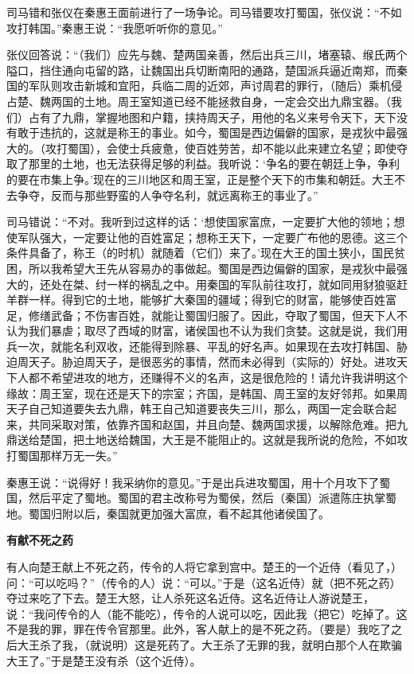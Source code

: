 \documentclass[12pt,UTF-8,openany,a4]{ctexbook}
\begin{document}
\begin{large}
    司马错和张仪在秦惠王面前进行了一场争论。司马错要攻打蜀国，张仪说：“不如攻打韩国。”秦惠王说：“我愿听听你的意见。”
    
    张仪回答说：“（我们）应先与魏、楚两国亲善，然后出兵三川，堵塞辕、缑氏两个隘口，挡住通向屯留的路，让魏国出兵切断南阳的通路，楚国派兵逼近南郑，而秦国的军队则攻击新城和宜阳，兵临二周的近郊，声讨周君的罪行，（随后）乘机侵占楚、魏两国的土地。周王室知道已经不能拯救自身，一定会交出九鼎宝器。（我们）占有了九鼎，掌握地图和户籍，挟持周天子，用他的名义来号令天下，天下没有敢于违抗的，这就是称王的事业。如今，蜀国是西边偏僻的国家，是戎狄中最强大的。（攻打蜀国），会使士兵疲惫，使百姓劳苦，却不能以此来建立名望；即使夺取了那里的土地，也无法获得足够的利益。我听说：‘争名的要在朝廷上争，争利的要在市集上争。’现在的三川地区和周王室，正是整个天下的市集和朝廷。大王不去争夺，反而与那些野蛮的人争夺名利，就远离称王的事业了。”
    
    司马错说：“不对。我听到过这样的话：‘想使国家富庶，一定要扩大他的领地；想使军队强大，一定要让他的百姓富足；想称王天下，一定要广布他的恩德。这三个条件具备了，称王（的时机）就随着（它们）来了。’现在大王的国土狭小，国民贫困，所以我希望大王先从容易办的事做起。蜀国是西边偏僻的国家，是戎狄中最强大的，还处在桀、纣一样的祸乱之中。用秦国的军队前往攻打，就如同用豺狼驱赶羊群一样。得到它的土地，能够扩大秦国的疆域；得到它的财富，能够使百姓富足，修缮武备；不伤害百姓，就能让蜀国归服了。因此，夺取了蜀国，但天下人不认为我们暴虐；取尽了西域的财富，诸侯国也不认为我们贪婪。这就是说，我们用兵一次，就能名利双收，还能得到除暴、平乱的好名声。如果现在去攻打韩国、胁迫周天子。胁迫周天子，是很恶劣的事情，然而未必得到（实际的）好处。进攻天下人都不希望进攻的地方，还赚得不义的名声，这是很危险的！请允许我讲明这个缘故：周王室，现在还是天下的宗室；齐国，是韩国、周王室的友好邻邦。如果周天子自己知道要失去九鼎，韩王自己知道要丧失三川，那么，两国一定会联合起来，共同采取对策，依靠齐国和赵国，并且向楚、魏两国求援，以解除危难。把九鼎送给楚国，把土地送给魏国，大王是不能阻止的。这就是我所说的危险，不如攻打蜀国那样万无一失。”
    
    秦惠王说：“说得好！我采纳你的意见。”于是出兵进攻蜀国，用十个月攻下了蜀国，然后平定了蜀地。蜀国的君主改称号为蜀侯，然后（秦国）派遣陈庄执掌蜀地。蜀国归附以后，秦国就更加强大富庶，看不起其他诸侯国了。
    
    \begin{center}{\Large\textbf{有献不死之药}}\end{center}
    
    有人向楚王献上不死之药，传令的人将它拿到宫中。楚王的一个近侍（看见了，）问：“可以吃吗？”（传令的人）说：“可以。”于是（这名近侍）就（把不死之药）夺过来吃了下去。楚王大怒，让人杀死这名近侍。这名近侍让人游说楚王，说：“我问传令的人（能不能吃），传令的人说可以吃，因此我（把它）吃掉了。这不是我的罪，罪在传令官那里。此外，客人献上的是不死之药。（要是）我吃了之后大王杀了我，（就说明）这是死药了。大王杀了无罪的我，就明白那个人在欺骗大王了。”于是楚王没有杀（这个近侍）。
    

\end{large}
\end{document}
